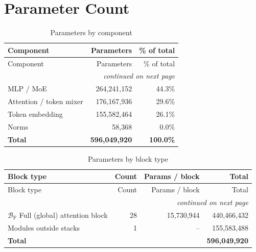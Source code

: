 \documentclass[10pt,a4paper]{article}
\theoremstyle{definition}
\begin{document}
\section{Parameter Count}
\begin{longtable}{lrr}
\caption{Parameters by component}\\
\toprule
Component & Parameters & \% of total \\
\midrule
\endfirsthead
\toprule
Component & Parameters & \% of total \\
\midrule
\endhead
\midrule \multicolumn{3}{r}{\textit{continued on next page}} \\
\endfoot
\bottomrule
\endlastfoot
MLP / MoE & 264,241,152 & 44.3\% \\
Attention / token mixer & 176,167,936 & 29.6\% \\
Token embedding & 155,582,464 & 26.1\% \\
Norms & 58,368 & 0.0\% \\
\midrule \textbf{Total} & \textbf{596,049,920} & \textbf{100.0\%} \\
\end{longtable}
\begin{longtable}{p{8cm}rrr}
\caption{Parameters by block type}\\
\toprule
Block type & Count & Params / block & Total \\
\midrule
\endfirsthead
\toprule
Block type & Count & Params / block & Total \\
\midrule
\endhead
\midrule \multicolumn{4}{r}{\textit{continued on next page}} \\
\endfoot
\bottomrule
\endlastfoot
$\mathcal{B}_{\mathrm{F}}$ Full (global) attention block & 28 & 15,730,944 & 440,466,432 \\
Modules outside stacks & 1 & -- & 155,583,488 \\
\midrule \textbf{Total} & & & \textbf{596,049,920} \\
\end{longtable}
\end{document}
